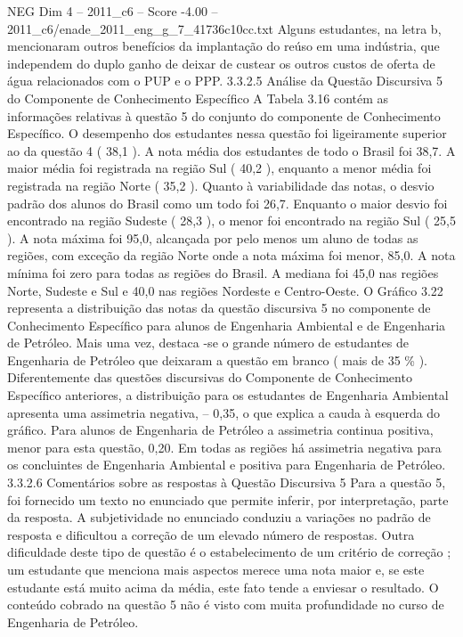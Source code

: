 \begin{textsample}{NEG Dim 4 – 2011\_c6 – Score -4.00 – 2011\_c6/enade\_2011\_eng\_g\_7\_41736c10cc.txt}
Alguns estudantes, na letra b, mencionaram outros benefícios da implantação do reúso em uma indústria, que independem do duplo ganho de deixar de custear os outros custos de oferta de água relacionados com o PUP e o PPP. 3.3.2.5 Análise da Questão Discursiva 5 do Componente de Conhecimento Específico A Tabela 3.16 contém as informações relativas à questão 5 do conjunto do componente de Conhecimento Específico.
O desempenho dos estudantes nessa questão foi ligeiramente superior ao da questão 4 ( 38,1 ).
A nota média dos estudantes de todo o Brasil foi 38,7.
A maior média foi registrada na região Sul ( 40,2 ), enquanto a menor média foi registrada na região Norte ( 35,2 ).
Quanto à variabilidade das notas, o desvio padrão dos alunos do Brasil como um todo foi 26,7.
Enquanto o maior desvio foi encontrado na região Sudeste ( 28,3 ), o menor foi encontrado na região Sul ( 25,5 ).
A nota máxima foi 95,0, alcançada por pelo menos um aluno de todas as regiões, com exceção da região Norte onde a nota máxima foi menor, 85,0.
A nota mínima foi zero para todas as regiões do Brasil.
A mediana foi 45,0 nas regiões Norte, Sudeste e Sul e 40,0 nas regiões Nordeste e Centro-Oeste.
O Gráfico 3.22 representa a distribuição das notas da questão discursiva 5 no componente de Conhecimento Específico para alunos de Engenharia Ambiental e de Engenharia de Petróleo.
Mais uma vez, destaca -se o grande número de estudantes de Engenharia de Petróleo que deixaram a questão em branco ( mais de 35 \% ).
Diferentemente das questões discursivas do Componente de Conhecimento Específico anteriores, a distribuição para os estudantes de Engenharia Ambiental apresenta uma assimetria negativa, – 0,35, o que explica a cauda à esquerda do gráfico.
Para alunos de Engenharia de Petróleo a assimetria continua positiva, menor para esta questão, 0,20.
Em todas as regiões há assimetria negativa para os concluintes de Engenharia Ambiental e positiva para Engenharia de Petróleo. 3.3.2.6 Comentários sobre as respostas à Questão Discursiva 5 Para a questão 5, foi fornecido um texto no enunciado que permite inferir, por interpretação, parte da resposta.
A subjetividade no enunciado conduziu a variações no padrão de resposta e dificultou a correção de um elevado número de respostas.
Outra dificuldade deste tipo de questão é o estabelecimento de um critério de correção ; um estudante que menciona mais aspectos merece uma nota maior e, se este estudante está muito acima da média, este fato tende a enviesar o resultado.
O conteúdo cobrado na questão 5 não é visto com muita profundidade no curso de Engenharia de Petróleo.

\end{textsample}
